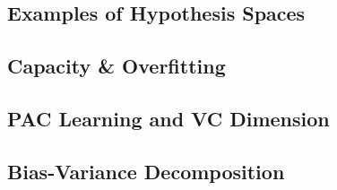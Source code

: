 
\subsection{Examples of Hypothesis Spaces}


\subsection{Capacity \& Overfitting}


\subsection{PAC Learning and VC Dimension}


\subsection{Bias-Variance Decomposition}




